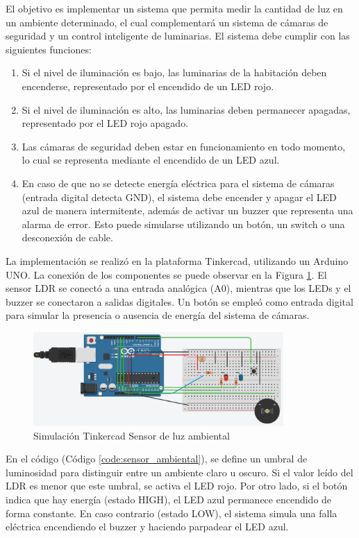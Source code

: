 \documentclass{article}
\begin{document}
El objetivo es implementar un sistema que permita medir la cantidad de luz en un ambiente determinado, el cual complementará un sistema de cámaras de seguridad y un control inteligente de luminarias. El sistema debe cumplir con las siguientes funciones:
\begin{enumerate}
    \item Si el nivel de iluminación es bajo, las luminarias de la habitación deben encenderse, representado por el encendido de un LED rojo.
    \item Si el nivel de iluminación es alto, las luminarias deben permanecer apagadas, representado por el LED rojo apagado.
    \item Las cámaras de seguridad deben estar en funcionamiento en todo momento, lo cual se representa mediante el encendido de un LED azul.
    \item En caso de que no se detecte energía eléctrica para el sistema de cámaras (entrada digital detecta GND), el sistema debe encender y apagar el LED azul de manera intermitente, además de activar un buzzer que representa una alarma de error. Esto puede simularse utilizando un botón, un switch o una desconexión de cable.
\end{enumerate}

La implementación se realizó en la plataforma Tinkercad, utilizando un Arduino UNO. La conexión de los componentes se puede observar en la Figura \ref{fig:luz_ambiental}. El sensor LDR se conectó a una entrada analógica (A0), mientras que los LEDs y el buzzer se conectaron a salidas digitales. Un botón se empleó como entrada digital para simular la presencia o ausencia de energía del sistema de cámaras.

\begin{figure}[H]
    \centering
    \includegraphics[width=0.85\textwidth]{./img/ckpt_1.png}
    \caption{Simulación Tinkercad Sensor de luz ambiental}
    \label{fig:luz_ambiental}
\end{figure}

En el código (Código \ref{code:sensor_ambiental}), se define un umbral de luminosidad para distinguir entre un ambiente claro u oscuro. Si el valor leído del LDR es menor que este umbral, se activa el LED rojo. Por otro lado, si el botón indica que hay energía (estado HIGH), el LED azul permanece encendido de forma constante. En caso contrario (estado LOW), el sistema simula una falla eléctrica encendiendo el buzzer y haciendo parpadear el LED azul.
\end{document}
